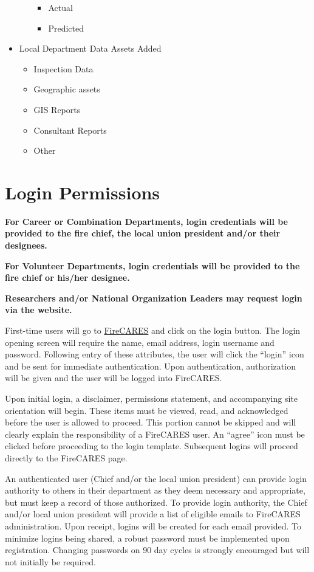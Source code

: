 \documentclass[12pt,oneside]{book}
\begin{document}
\begin{itemize}[noitemsep]
\begin{itemize}[noitemsep]
    \begin{itemize}[noitemsep]
    \item Actual
    \item Predicted
    \end{itemize}
  \end{itemize}
\item Local Department Data Assets Added
  \begin{itemize}[noitemsep]
  \item Inspection Data
  \item Geographic assets
  \item GIS Reports
  \item Consultant Reports
  \item Other
  \end{itemize}
\end{itemize}

\chapter{Login Permissions}

{\bf For Career or Combination Departments, login credentials will be provided to the fire chief, the local union president and/or their designees.}

{\bf For Volunteer Departments, login credentials will be provided to the fire chief or his/her designee.}

{\bf Researchers and/or National Organization Leaders may request login via the website.}

First-time users will go to \href{https://firecares.org}{FireCARES} and click on the login button. The login opening screen will require the name, email address, login username and password. Following entry of these attributes, the user will click the ``login'' icon and be sent for immediate authentication. Upon authentication, authorization will be given and the user will be logged into FireCARES.

Upon initial login, a disclaimer, permissions statement, and accompanying site orientation will begin. These items must be viewed, read, and acknowledged before the user is allowed to proceed. This portion cannot be skipped and will clearly explain the responsibility of a FireCARES user. An ``agree'' icon must be clicked before proceeding to the login template. Subsequent logins will proceed directly to the FireCARES page.

An authenticated user (Chief and/or the local union president) can provide login authority to others in their department as they deem necessary and appropriate, but must keep a record of those authorized. To provide login authority, the Chief and/or local union president will provide a list of eligible emails to FireCARES administration. Upon receipt, logins will be created for each email provided. To minimize logins being shared, a robust password must be implemented upon registration. Changing passwords on 90 day cycles is strongly encouraged but will not initially be required.
\end{document}
